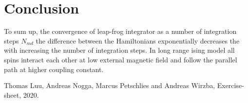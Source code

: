 \documentclass[11pt, a4paper, DIV=12]{scrartcl}
\begin{document}
\section{Conclusion}
To sum up, the convergence of leap-frog integrator as a number of integration steps $ N_{md}$ the difference between the Hamiltonians exponentially decreases the with increasing the number of integration steps. In long range ising model all spins interact each other at low external magnetic field and follow the parallel path at higher  coupling constant. 
\begin{thebibliography}{12}
	Thomas Luu, Andreas Nogga, Marcus Petschlies and  Andreas Wirzba, Exercise-sheet, 2020. 
	
	
\end{thebibliography}	
\end{document}
